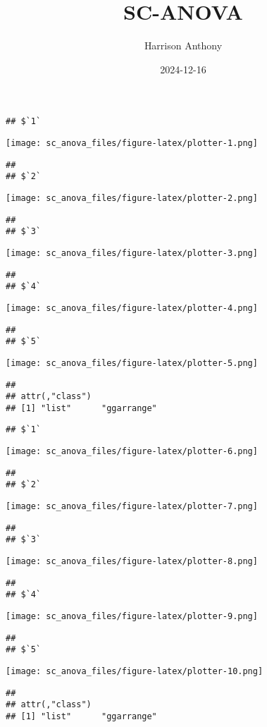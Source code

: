 \documentclass[
]{article}
\title{SC-ANOVA}
\author{Harrison Anthony}
\date{2024-12-16}
\begin{document}
\maketitle

\begin{verbatim}
## $`1`
\end{verbatim}

\texttt{[image: sc\_anova\_files/figure-latex/plotter-1.png]}

\begin{verbatim}
## 
## $`2`
\end{verbatim}

\texttt{[image: sc\_anova\_files/figure-latex/plotter-2.png]}

\begin{verbatim}
## 
## $`3`
\end{verbatim}

\texttt{[image: sc\_anova\_files/figure-latex/plotter-3.png]}

\begin{verbatim}
## 
## $`4`
\end{verbatim}

\texttt{[image: sc\_anova\_files/figure-latex/plotter-4.png]}

\begin{verbatim}
## 
## $`5`
\end{verbatim}

\texttt{[image: sc\_anova\_files/figure-latex/plotter-5.png]}

\begin{verbatim}
## 
## attr(,"class")
## [1] "list"      "ggarrange"
\end{verbatim}

\begin{verbatim}
## $`1`
\end{verbatim}

\texttt{[image: sc\_anova\_files/figure-latex/plotter-6.png]}

\begin{verbatim}
## 
## $`2`
\end{verbatim}

\texttt{[image: sc\_anova\_files/figure-latex/plotter-7.png]}

\begin{verbatim}
## 
## $`3`
\end{verbatim}

\texttt{[image: sc\_anova\_files/figure-latex/plotter-8.png]}

\begin{verbatim}
## 
## $`4`
\end{verbatim}

\texttt{[image: sc\_anova\_files/figure-latex/plotter-9.png]}

\begin{verbatim}
## 
## $`5`
\end{verbatim}

\texttt{[image: sc\_anova\_files/figure-latex/plotter-10.png]}

\begin{verbatim}
## 
## attr(,"class")
## [1] "list"      "ggarrange"
\end{verbatim}
\end{document}

